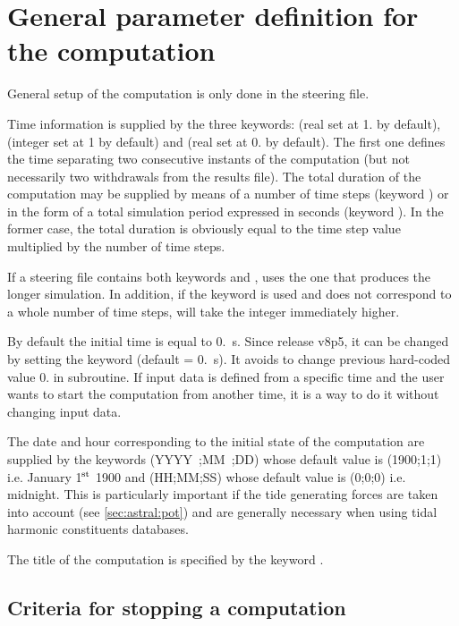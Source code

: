 \chapter{General parameter definition for the computation}
\label{ch:gen:par:def:comp}
General setup of the computation is only done in the steering
file.

Time information is supplied by the three keywords:
 (real set at 1. by default), 
(integer set at 1 by default) and  (real set at 0. by default).
The first one defines the time separating two consecutive instants of the
computation (but not necessarily two withdrawals from the results file).
The total duration of the computation may be supplied by means
of a number of time steps (keyword )
or in the form of a total simulation period expressed in seconds
(keyword ).
In the former case, the total duration is obviously equal to the time step value
multiplied by the number of time steps.

If a steering file contains both keywords 
and ,  uses the one that produces
the longer simulation.
In addition, if the keyword  is used and does not correspond
to a whole number of time steps,  will take the integer immediately
higher.

By default the initial time is equal to 0.~s.
Since release v8p5, it can be changed by setting the keyword
 (default = 0.~s).
It avoids to change previous hard-coded value 0. in  subroutine.
If input data is defined from a specific time and the user wants to start the
computation from another time, it is a way to do it without changing input data.

The date and hour corresponding to the initial state of the computation
are supplied by the keywords  (YYYY~;MM~;DD)
whose default value is (1900;1;1) i.e. January 1$^{\rm{st}}$ 1900
and  (HH;MM;SS)
whose default value is (0;0;0) i.e. midnight.
This is particularly important if the tide generating forces are taken
into account (see \ref{sec:astral:pot}) and are generally necessary
when using tidal harmonic constituents databases.

The title of the computation is specified by the keyword .


\section{Criteria for stopping a computation}


